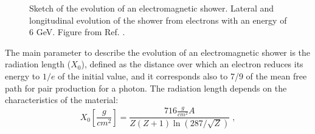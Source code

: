 \begin{figure}[ht]
\centering
{}
\caption{ Sketch of the evolution of an electromagnetic shower. 
 Lateral and longitudinal evolution of the shower from electrons with an energy of 6 GeV. Figure from Ref. \cite{grupen_shwartz_2008}.}
\label{fig:det:shower_elec}
\end{figure}


The main parameter to describe the evolution of an electromagnetic shower is the radiation length ($X_0$), defined as the distance over which an electron reduces its energy to $1/e$ of the initial value, and it corresponds also to 7/9 of the mean free path for pair production for a photon. The radiation length depends on the characteristics of the material:
\begin{equation}
X_0 [\frac{g}{cm^2}] = \frac{716 \frac{g}{ cm^2} A }{Z(Z+1) \ln\left(287/\sqrt{Z}\right)} \; , \nonumber
\end{equation}

